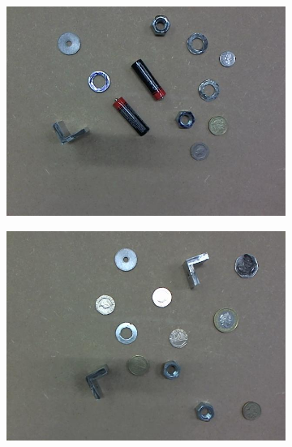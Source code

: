 \documentclass[main.tex]{subfiles}
\begin{document}
\begin{figure}[!h]
  \centering
  \begin{subfigure}[b]{.3\textwidth}
    \centering
    \includegraphics[width=\textwidth]{./img/sample_fig/02.jpg}
  \end{subfigure}
  \begin{subfigure}[b]{.3\textwidth}
    \centering
    \includegraphics[width=\textwidth]{./img/sample_fig/04.jpg}
  \end{subfigure}
  \begin{subfigure}[b]{.3\textwidth}
    \centering

\end{subfigure}
\end{figure}
\end{document}

